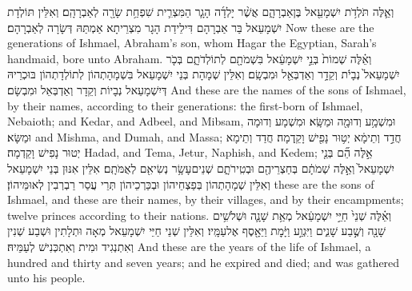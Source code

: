 {וְאֵ֛לֶּה תֹּלְדֹ֥ת יִשְׁמָעֵ֖אל בֶּן\maqqaf אַבְרָהָ֑ם אֲשֶׁ֨ר יָלְדָ֜ה הָגָ֧ר הַמִּצְרִ֛ית שִׁפְחַ֥ת שָׂרָ֖ה לְאַבְרָהָֽם׃}
{וְאִלֵּין תּוֹלְדָת יִשְׁמָעֵאל בַּר אַבְרָהָם דִּילֵידַת הָגָר מִצְרֵיתָא אַמְתַּהּ דְּשָׂרָה לְאַבְרָהָם׃}
{Now these are the generations of Ishmael, Abraham’s son, whom Hagar the Egyptian, Sarah’s handmaid, bore unto Abraham.}{}
{וְאֵ֗לֶּה שְׁמוֹת֙ בְּנֵ֣י יִשְׁמָעֵ֔אל בִּשְׁמֹתָ֖ם לְתוֹלְדֹתָ֑ם בְּכֹ֤ר יִשְׁמָעֵאל֙ נְבָיֹ֔ת וְקֵדָ֥ר וְאַדְבְּאֵ֖ל וּמִבְשָֽׂם׃}
{וְאִלֵּין שְׁמָהָת בְּנֵי יִשְׁמָעֵאל בִּשְׁמָהָתְהוֹן לְתוֹלְדָתְהוֹן בּוּכְרֵיהּ דְּיִשְׁמָעֵאל נְבָיוֹת וְקֵדָר וְאַדְבְּאֵל וּמִבְשָׂם׃}
{And these are the names of the sons of Ishmael, by their names, according to their generations: the first-born of Ishmael, Nebaioth; and Kedar, and Adbeel, and Mibsam,}{}
{וּמִשְׁמָ֥ע וְדוּמָ֖ה וּמַשָּֽׂא׃}
{וּמִשְׁמָע וְדוּמָה וּמַשָּׂא׃}
{and Mishma, and Dumah, and Massa;}{}
{חֲדַ֣ד וְתֵימָ֔א יְט֥וּר נָפִ֖ישׁ וָקֵֽדְמָה׃}
{חֲדַד וְתֵימָא יְטוּר נָפִישׁ וָקֵדְמָה׃}
{Hadad, and Tema, Jetur, Naphish, and Kedem;}{}
{אֵ֣לֶּה הֵ֞ם בְּנֵ֤י יִשְׁמָעֵאל֙ וְאֵ֣לֶּה שְׁמֹתָ֔ם בְּחַצְרֵיהֶ֖ם וּבְטִֽירֹתָ֑ם שְׁנֵים\maqqaf עָשָׂ֥ר נְשִׂיאִ֖ם לְאֻמֹּתָֽם׃}
{אִלֵּין אִנּוּן בְּנֵי יִשְׁמָעֵאל וְאִלֵּין שְׁמָהָתְהוֹן בְּפַצְחֵיהוֹן וּבְכַּרְכֵיהוֹן תְּרֵי עֲסַר רַבְרְבִין לְאוּמֵּיהוֹן׃}
{these are the sons of Ishmael, and these are their names, by their villages, and by their encampments; twelve princes according to their nations.}{}
{וְאֵ֗לֶּה שְׁנֵי֙ חַיֵּ֣י יִשְׁמָעֵ֔אל מְאַ֥ת שָׁנָ֛ה וּשְׁלֹשִׁ֥ים שָׁנָ֖ה וְשֶׁ֣בַע שָׁנִ֑ים וַיִּגְוַ֣ע וַיָּ֔מׇת וַיֵּאָ֖סֶף אֶל\maqqaf עַמָּֽיו׃}
{וְאִלֵּין שְׁנֵי חַיֵּי יִשְׁמָעֵאל מְאָה וּתְלָתִין וּשְׁבַע שְׁנִין וְאִתְנְגִיד וּמִית וְאִתְכְּנִישׁ לְעַמֵּיהּ׃}
{And these are the years of the life of Ishmael, a hundred and thirty and seven years; and he expired and died; and was gathered unto his people.}{}
